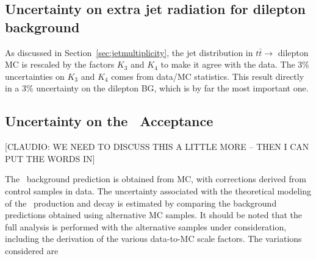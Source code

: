 \subsection{Uncertainty on extra jet radiation for dilepton
  background}
As discussed in Section~\ref{sec:jetmultiplicity}, the 
jet distribution in
$t\bar{t} \to$
dilepton MC is rescaled by the factors $K_3$ and $K_4$ to make 
it agree with the data.  The 3\% uncertainties on $K_3$ and $K_4$
comes from data/MC statistics.  This  
result directly in a 3\% uncertainty on the dilepton BG, which is by far 
the most important one.


\subsection{Uncertainty on the \ttll\ Acceptance}

[CLAUDIO: WE NEED TO DISCUSS THIS A LITTLE MORE -- THEN I CAN PUT THE
WORDS IN]

The \ttbar\ background prediction is obtained from MC, with corrections
derived from control samples in data. The uncertainty associated with
the theoretical modeling of the \ttbar\ production and decay is
estimated by comparing the background predictions obtained using 
alternative MC samples. It should be noted that the full analysis is
performed with the alternative samples under consideration, 
including the derivation of the various data-to-MC scale factors. 
The variations considered are

